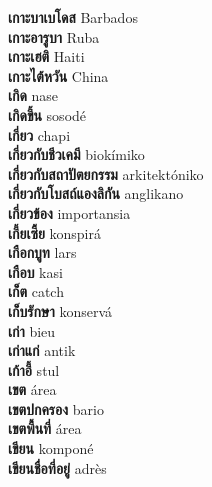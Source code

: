 \textbf{ เกาะบาเบโดส  } Barbados \\
\textbf{ เกาะอารูบา  } Ruba \\
\textbf{ เกาะเฮติ  } Haiti \\
\textbf{ เกาะไต้หวัน  } China \\
\textbf{ เกิด  } nase \\
\textbf{ เกิดขึ้น  } sosodé \\
\textbf{ เกี่ยว  } chapi \\
\textbf{ เกี่ยวกับชีวเคมี  } biokímiko \\
\textbf{ เกี่ยวกับสถาปัตยกรรม  } arkitektóniko \\
\textbf{ เกี่ยวกับโบสถ์แองลิกัน  } anglikano \\
\textbf{ เกี่ยวข้อง  } importansia \\
\textbf{ เกี้ยเซี้ย  } konspirá \\
\textbf{ เกือกบูท  } lars \\
\textbf{ เกือบ  } kasi \\
\textbf{ เก็ต  } catch \\
\textbf{ เก็บรักษา  } konservá \\
\textbf{ เก่า  } bieu \\
\textbf{ เก่าแก่  } antik \\
\textbf{ เก้าอี้  } stul \\
\textbf{ เขต  } área \\
\textbf{ เขตปกครอง  } bario \\
\textbf{ เขตพื้นที่  } área \\
\textbf{ เขียน  } komponé \\
\textbf{ เขียนชื่อที่อยู่  } adrès \\
